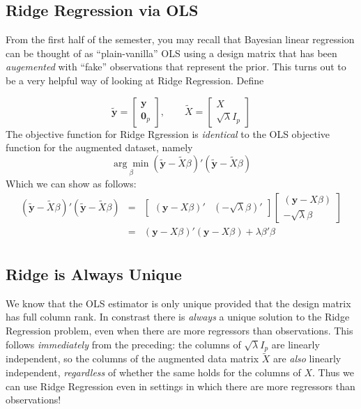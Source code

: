 \documentclass[12pt]{article}
\theoremstyle{definition}
\begin{document}
\subsection{Ridge Regression via OLS}
From the first half of the semester, you may recall that Bayesian linear regression can be thought of as ``plain-vanilla'' OLS using a design matrix that has been \emph{augemented} with ``fake'' observations that represent the prior. This turns out to be a very helpful way of looking at Ridge Regression. Define

$$\widetilde{\textbf{y}} = \left[ \begin{array}
	{c} \textbf{y} \\ \textbf{0}_p
\end{array}\right], \quad \quad \widetilde{X} = \left[ \begin{array}
	{c} X \\ \sqrt{\lambda} I_p
\end{array}\right]$$
The objective function for Ridge Rgression is \emph{identical} to the OLS objective function for the augmented dataset, namely
	$$\underset{\beta}{\arg \min} \left(\widetilde{\mathbf{y}} - \widetilde{X}\beta\right)'\left(\widetilde{\mathbf{y}} - \widetilde{X}\beta\right)$$
Which we can show as follows:
\begin{eqnarray*}
	\left(\widetilde{\mathbf{y}} - \widetilde{X}\beta\right)'\left(\widetilde{\mathbf{y}} - \widetilde{X}\beta\right) &=& \left[\begin{array}
		{cc} (\mathbf{y} - X\beta)' & (-\sqrt{\lambda}\beta)'
	\end{array} \right] \left[\begin{array}
		{c} (\mathbf{y} - X\beta) \\ -\sqrt{\lambda} \beta
	\end{array} \right]\\
		&=& (\mathbf{y} - X\beta)' (\mathbf{y} - X\beta) + \lambda \beta'\beta\\
\end{eqnarray*}

\subsection{Ridge is Always Unique} We know that the OLS estimator is only unique provided that the design matrix has full column rank. In constrast there is \emph{always} a unique solution to the Ridge Regression problem, even when there are more regressors than observations. This follows \emph{immediately} from the preceding: the columns of $\sqrt{\lambda}I_p$ are linearly independent, so the columns of the augmented data matrix $\widetilde{X}$ are \emph{also} linearly independent, \emph{regardless} of whether the same holds for the columns of $X$. Thus we can use Ridge Regression even in settings in which there are more regressors than observations!
\end{document}
